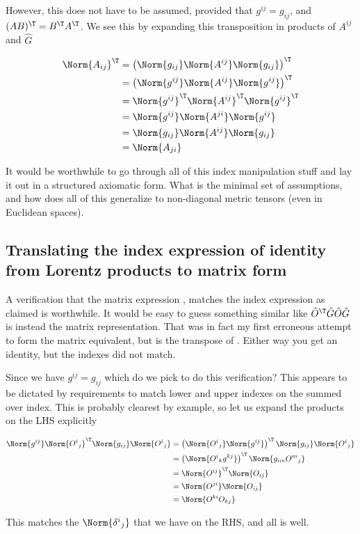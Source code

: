 However, this does not have to be assumed, provided that $g^{i j} = g_{i j}$, and $(AB)^\T = B^\T A^\T$.  We see this by expanding this transposition in products of $A^{i j}$ and $\hat{G}$

\begin{align*}
\Norm{ A_{i j} }^\T
&= \left( \Norm{g_{i j}} \Norm{ A^{i j} } \Norm{g_{i j}} \right)^\T \\
&= \left( \Norm{g^{i j}} \Norm{ A^{i j} } \Norm{g^{i j}} \right)^\T \\
&= \Norm{g^{i j}}^\T \Norm{ A^{i j}}^\T \Norm{g^{i j}}^\T \\
&= \Norm{g^{i j}} \Norm{ A^{j i}} \Norm{g^{i j}} \\
&= \Norm{g_{i j}} \Norm{ A^{i j}} \Norm{g_{i j}} \\
&= \Norm{ A_{j i}} 
\end{align*}

It would be worthwhile to go through all of this index manipulation stuff and lay it out in a structured axiomatic form.  What is the minimal set of assumptions, and how does all of this generalize to non-diagonal metric tensors (even in Euclidean spaces).

\subsection{Translating the index expression of identity from Lorentz products to matrix form}

A verification that the matrix expression , matches the index expression  as claimed is worthwhile.  It would be easy to guess something similar like $\hat{O}^\T \hat{G} \hat{O} \hat{G}$ is instead the matrix representation.  That was in fact my first erroneous attempt to form the matrix equivalent, but is the transpose of .  Either way you get an identity, but the indexes did not match.

Since we have $g^{i j} = g_{i j}$ which do we pick to do this verification?  This appears to be dictated by requirements to match lower and upper indexes on the summed over index.  This is probably clearest by example, so let us expand the products on the LHS explicitly

\begin{align*}
\Norm{ g^{i j} } 
\Norm{ {O^{i}}_j } ^\T
\Norm{ g_{i j} }
\Norm{ {O^{i}}_j } 
&=
\left( \Norm{ {O^{i}}_j } 
\Norm{ g^{i j} } \right) ^\T
\Norm{ g_{i j} }
\Norm{ {O^{i}}_j }  \\
&=
\left( \Norm{ {O^{i}}_k g^{k j} } \right) ^\T
\Norm{ g_{i m} {O^{m}}_j }  \\
&=
\Norm{ O^{i j} } ^\T
\Norm{ O_{i j} }  \\
&=
\Norm{ O^{j i} } 
\Norm{ O_{i j} }  \\
&=
\Norm{ O^{k i} O_{k j} }  \\
\end{align*}

This matches the $\Norm{{\delta^i}_j}$ that we have on the RHS, and all is well.
